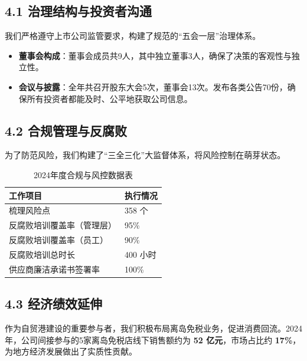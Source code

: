 \documentclass[a4paper,12pt]{article}
\begin{document}
\subsection{4.1 治理结构与投资者沟通}

我们严格遵守上市公司监管要求，构建了规范的“五会一层”治理体系。

\begin{itemize}
    \item \textbf{董事会构成}：董事会成员共9人，其中独立董事3人，确保了决策的客观性与独立性。
    \item \textbf{会议与披露}：全年共召开股东大会5次，董事会13次。发布各类公告70份，确保所有投资者都能及时、公平地获取公司信息。
\end{itemize}

\subsection{4.2 合规管理与反腐败}

为了防范风险，我们构建了“三全三化”大监督体系，将风险控制在萌芽状态。

\begin{table}[h]
    \centering
    \caption{2024年度合规与风控数据表}
    \label{tab:gov_data}
    \renewcommand{\arraystretch}{1.3}
    \begin{tabular}{p{8cm} p{4cm}}
        \toprule
        \textbf{工作项目} & \textbf{执行情况} \\
        \midrule
        梳理风险点 & 358 个 \\
        反腐败培训覆盖率（管理层） & 95\% \\
        反腐败培训覆盖率（员工） & 90\% \\
        反腐败培训总时长 & 400 小时 \\
        供应商廉洁承诺书签署率 & 100\% \\
        \bottomrule
    \end{tabular}
\end{table}

\subsection{4.3 经济绩效延伸}

作为自贸港建设的重要参与者，我们积极布局离岛免税业务，促进消费回流。2024年，公司间接参与的5家离岛免税店线下销售额约为 \textbf{52 亿元}，市场占比约 \textbf{17\%}，为地方经济发展做出了实质性贡献。
\end{document}
